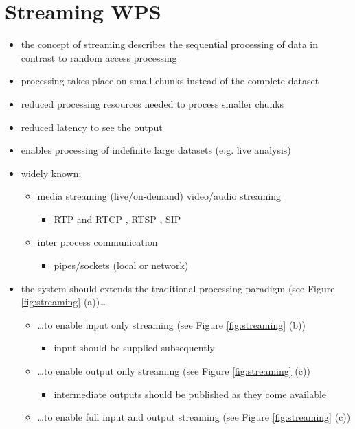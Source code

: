 \section{Streaming WPS}
	\begin{itemize}
		\item the concept of streaming describes the sequential processing of data in contrast to random access processing
		\item processing takes place on small chunks instead of the complete dataset
		\item reduced processing resources needed to process smaller chunks
		\item reduced latency to see the output
		\item enables processing of indefinite large datasets (e.g. live analysis)
		\item widely known:
		\begin{itemize}
			\item media streaming (live/on-demand) video/audio streaming
			\begin{itemize}
				\item RTP and RTCP \citep{ietf:rfc3550}, RTSP \citep{ietf:rfc2326}, SIP \citep{ietf:rfc3261}
			\end{itemize}
			\item inter process communication
			\begin{itemize}
				\item pipes/sockets (local or network) \citep{buschmann1996pattern}
			\end{itemize}
		\end{itemize}
		\item the system should extends the traditional processing paradigm  (see Figure \ref{fig:streaming} (a))\dots
		\begin{itemize}
			\item \dots to enable input only streaming (see Figure \ref{fig:streaming} (b))
			\begin{itemize}
				\item input should be supplied subsequently
			\end{itemize}
			\item \dots to enable output only streaming  (see Figure \ref{fig:streaming} (c))
			\begin{itemize}
				\item intermediate outputs should be published as they come available
			\end{itemize}
			\item \dots to enable full input and output streaming  (see Figure \ref{fig:streaming} (c))

\end{itemize}
\end{itemize}
